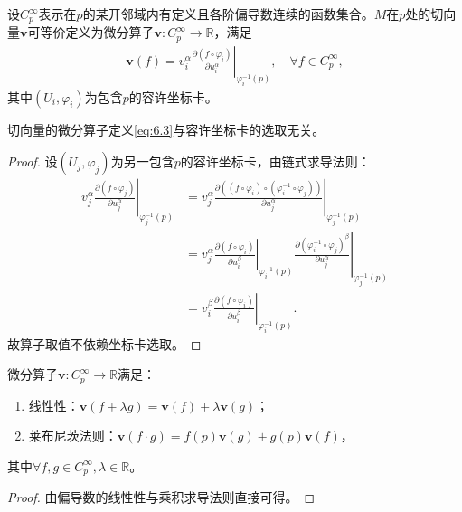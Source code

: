 \documentclass[../../main.tex]{subfiles}%
\begin{document}
\begin{definition}
设$C_p^\infty$表示在$p$的某开邻域内有定义且各阶偏导数连续的函数集合。$M$在$p$处的切向量$\bm{v}$可等价定义为微分算子$\bm{v}:C_p^\infty\to\mathbb{R}$，满足
\begin{align}
\bm{v}(f)=v_i^\alpha\left.\frac{\partial(f\circ\varphi_i)}{\partial u_i^\alpha}\right|_{\varphi_i^{-1}(p)},\quad \forall f\in C_p^\infty,\label{eq:6.3}
\end{align}
其中$(U_i,\varphi_i)$为包含$p$的容许坐标卡。
\end{definition}

\begin{proposition}
切向量的微分算子定义\eqref{eq:6.3}与容许坐标卡的选取无关。
\end{proposition}

\begin{proof}

设$(U_j,\varphi_j)$为另一包含$p$的容许坐标卡，由链式求导法则：
\begin{align*}
v_j^\alpha\left.\frac{\partial(f\circ\varphi_j)}{\partial u_j^\alpha}\right|_{\varphi_j^{-1}(p)}
&=v_j^\alpha\left.\frac{\partial\left((f\circ\varphi_i)\circ(\varphi_i^{-1}\circ\varphi_j)\right)}{\partial u_j^\alpha}\right|_{\varphi_j^{-1}(p)}\\
&=v_j^\alpha\left.\frac{\partial(f\circ\varphi_i)}{\partial u_i^\beta}\right|_{\varphi_i^{-1}(p)}\left.\frac{\partial(\varphi_i^{-1}\circ\varphi_j)^\beta}{\partial u_j^\alpha}\right|_{\varphi_j^{-1}(p)}\\
&=v_i^\beta\left.\frac{\partial(f\circ\varphi_i)}{\partial u_i^\beta}\right|_{\varphi_i^{-1}(p)}.
\end{align*}
故算子取值不依赖坐标卡选取。

\end{proof}

\begin{proposition}
微分算子$\bm{v}:C_p^\infty\to\mathbb{R}$满足：
\begin{enumerate}[(1)]
\item 线性性：$\bm{v}(f+\lambda g)=\bm{v}(f)+\lambda\bm{v}(g)$；
\item 莱布尼茨法则：$\bm{v}(f\cdot g)=f(p)\bm{v}(g)+g(p)\bm{v}(f)$，
\end{enumerate}
其中$\forall f,g\in C_p^\infty,\lambda\in\mathbb{R}$。
\end{proposition}

\begin{proof}

由偏导数的线性性与乘积求导法则直接可得。

\end{proof}
\end{document}
